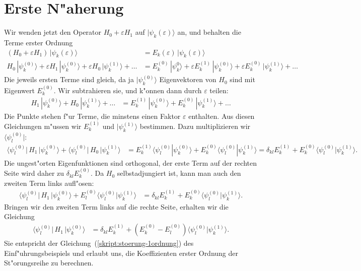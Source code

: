 \section{Erste N"aherung\label{section:erstenaeherung}}
Wir wenden jetzt den Operator $H_0+\varepsilon H_1$ auf
$|\psi_k(\varepsilon)\rangle$ an, und behalten die Terme erster Ordnung
\begin{align*}
(H_0+\varepsilon H_1)\,|\psi_k(\varepsilon)\rangle
&=
E_k(\varepsilon)\,|\psi_k(\varepsilon)\rangle
\\
H_0\,|\psi_k^{(0)}\rangle +\varepsilon H_1\,|\psi_k^{(0)}\rangle
+\varepsilon H_0\,|\psi_k^{(1)}\rangle
+\dots
&=
E_k^{(0)}\,|\psi_k^{0}\rangle + \varepsilon E_k^{(1)} \,|\psi_k^{(0)}\rangle
+ \varepsilon E_k^{(0)} \,|\psi_k^{(1)}\rangle + \dots
\end{align*}
Die jeweils ersten Terme sind gleich, da ja $|\psi_k^{(0)}\rangle$
Eigenvektoren von $H_0$ sind mit Eigenwert $E_k^{(0)}$. Wir subtrahieren sie,
und k"onnen dann durch $\varepsilon$ teilen:
\begin{align*}
H_1\,|\psi_k^{(0)}\rangle
+H_0\,|\psi_k^{(1)}\rangle
+ \dots
&=
E_k^{(1)}\,|\psi_k^{(0)}\rangle + E_k^{(0)} \,|\psi_k^{(1)}\rangle+\dots
\end{align*}
Die Punkte stehen f"ur Terme, die minstens einen Faktor $\varepsilon$
enthalten.
Aus diesen Gleichungen m"ussen wir $E_k^{(1)}$ und $|\psi_k^{(1)}\rangle$
bestimmen. Dazu multiplizieren wir $\langle \psi_l^{(0)}|$:
\begin{align*}
\langle \psi_l^{(0)}|\, H_1 \,|\psi_k^{(0)}\rangle
+
\langle \psi_l^{(0)}|\, H_0 \,|\psi_k^{(1)}\rangle
&=
E_k^{(1)}\langle\psi_l^{(0)}|\psi_k^{(0)}\rangle
+
E_k^{(0)}\langle\psi_l^{(0)}|\psi_k^{(1)}\rangle
=
\delta_{kl} E_k^{(1)}
+
E_k^{(0)}\langle\psi_l^{(0)}|\psi_k^{(1)}\rangle.
\end{align*}
Die ungest"orten Eigenfunktionen sind orthogonal, der erste
Term auf der rechten Seite wird daher zu $\delta_{kl}E_k^{(0)}$.
Da $H_0$ selbstadjungiert ist, kann man auch den zweiten Term links
aufl"osen:
\begin{align*}
\langle \psi_l^{(0)}|\, H_1 \,|\psi_k^{(0)}\rangle
+
E_l^{(0)}\langle \psi_l^{(0)}|\psi_k^{(1)}\rangle
&=
\delta_{kl} E_k^{(1)}
+
E_k^{(0)}\langle\psi_l^{(0)}|\psi_k^{(1)}\rangle.
\end{align*}
Bringen wir den zweiten Term links auf die rechte Seite, erhalten wir
die Gleichung
\begin{align*}
\langle \psi_l^{(0)}|\, H_1 \,|\psi_k^{(0)}\rangle
&=
\delta_{kl} E_k^{(1)}
+
(E_k^{(0)}-E_l^{(0)})\langle\psi_l^{(0)}|\psi_k^{(1)}\rangle.
\end{align*}
Sie entspricht der Gleichung~(\ref{skript:stoerung-1ordnung})
des Einf"uhrungsbeispiels und erlaubt uns, die Koeffizienten
erster Ordnung der St"orungsreihe zu berechnen.

